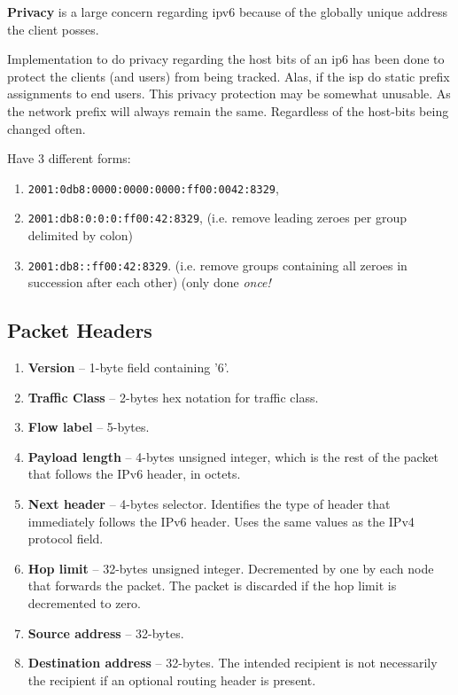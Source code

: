 \textbf{Privacy} is a large concern regarding \gls{ipv6} because of the globally unique address the client posses.

Implementation to do privacy regarding the host bits of an \gls{ip6} has been done to protect the clients (and users) from being tracked. Alas, if the \gls{isp} do static prefix assignments to end users. This privacy protection may be somewhat unusable. As the network prefix will always remain the same. Regardless of the host-bits being changed often.

Have 3 different forms:
\begin{enumerate}
    \item \texttt{2001:0db8:0000:0000:0000:ff00:0042:8329},
    \item \texttt{2001:db8:0:0:0:ff00:42:8329}, {\footnotesize (i.e. remove leading zeroes per group delimited by colon)}
    \item \texttt{2001:db8::ff00:42:8329}. {\footnotesize (i.e. remove groups containing all zeroes in succession after each other) (only done \textit{once!}}
\end{enumerate}

\subsection{Packet Headers}\cite{IPv6Pack77:online}


\begin{enumerate}
    \item \textbf{Version} -- 1-byte field containing '6'.
    \item \textbf{Traffic Class} -- 2-bytes hex notation for traffic class.
    \item \textbf{Flow label} -- 5-bytes.
    \item \textbf{Payload length} -- 4-bytes unsigned integer, which is the rest of the packet that follows the IPv6 header, in octets.
    \item \textbf{Next header} -- 4-bytes selector. Identifies the type of header that immediately follows the IPv6 header. Uses the same values as the IPv4 protocol field.
    \item \textbf{Hop limit} -- 32-bytes unsigned integer. Decremented by one by each node that forwards the packet. The packet is discarded if the hop limit is decremented to zero.
    \item \textbf{Source address} -- 32-bytes.
    \item \textbf{Destination address} -- 32-bytes. The intended recipient is not necessarily the recipient if an optional routing header is present.
\end{enumerate}

